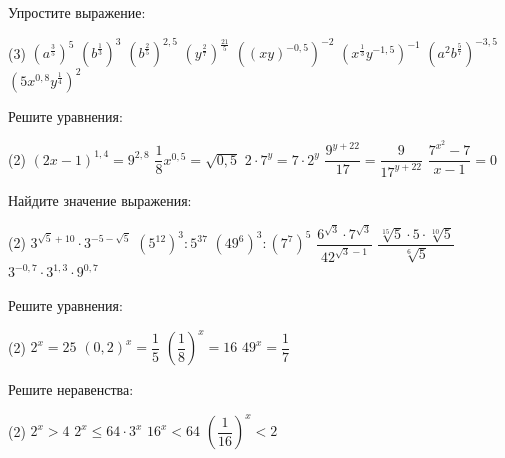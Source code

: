 \begin{homework}[number=2]
	\begin{listofex}
		\item Упростите выражение:
		\begin{tasks}(3)
			\task \( \left(a^{ \tfrac{3}{5}} \right)^5 \)
			\task \( \left(b^{\tfrac{1}{3}} \right)^3 \)
			\task \( \left(b^{\tfrac{2}{5}}\right)^{2,5} \)
			\task \( \left(y^{ \tfrac{2}{7}}\right)^{\tfrac{21}{5}} \)
			\task \( ((xy)^{-0,5})^{-2} \)
			\task \( \left(x^{ \tfrac{1}{3}}y^{-1,5}\right)^{-1} \)
			\task \( \left(a^{2}b^{\tfrac{5}{7}}\right)^{-3,5} \)
			\task \( \left(5x^{0,8}y^{\tfrac{1}{4}}\right)^{2} \)
		\end{tasks}
		\item Решите уравнения:
		\begin{tasks}(2)
			\task \( (2x-1)^{1,4}=9^{2,8} \)
			\task \( \dfrac{1}{8}x^{0,5} = \sqrt{0,5} \)
			\task \( 2 \cdot 7^y = 7 \cdot 2^y \)
			\task \( \dfrac{9^{y+22}}{17}=\dfrac{9}{17^{y+22}} \)
			\task \( \dfrac{7^{x^2}-7}{x-1}=0 \)
		\end{tasks}
		\item Найдите значение выражения:
		\begin{tasks}(2)
			\task \( 3^{\sqrt{5}+10}\cdot3^{-5-\sqrt{5}} \)
			\task \( (5^{12})^3 : 5^{37} \)
			\task \( (49^6)^3:(7^7)^5 \)
			\task \( \dfrac{6^{\sqrt{3}}\cdot7^{\sqrt{3}}}{42^{\sqrt{3}-1}} \)
			\task \( \dfrac{\sqrt[15]{5}\cdot5\cdot\sqrt[10]{5}}{\sqrt[6]{5}} \)
			\task \( 3^{-0,7}\cdot 3^{1,3} \cdot 9^{0,7}\)
		\end{tasks}
		\item Решите уравнения:
		\begin{tasks}(2)
			\task \( 2^x=25 \)
			\task \( (0,2)^x=\dfrac{1}{5} \)
			\task \( \left(\dfrac{1}{8}\right)^x=16 \)
			\task \( 49^x=\dfrac{1}{7} \)
		\end{tasks}
		\item Решите неравенства:
		\begin{tasks}(2)
			\task \( 2^x > 4 \)
			\task \( 2^x \le 64 \cdot 3^x \)
			\task \( 16^x < 64 \)
			\task \( \left( \dfrac{1}{16} \right)^x < 2 \)
		\end{tasks}
	\end{listofex}
\end{homework}

